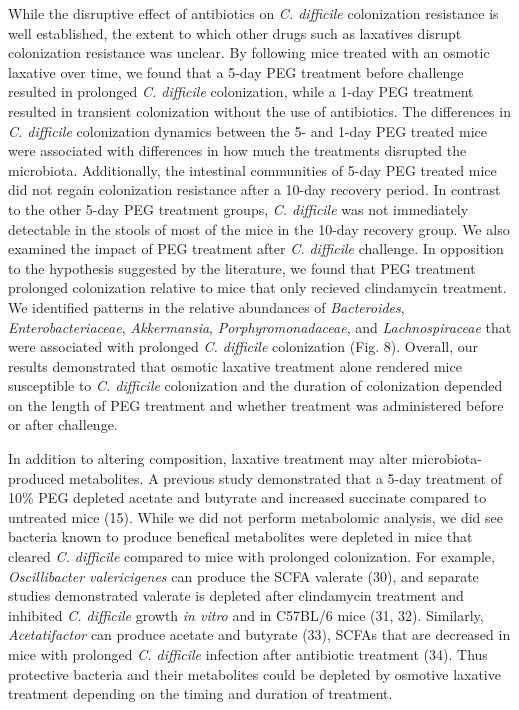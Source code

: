 \documentclass[
  11pt,
]{article}
\begin{document}
While the disruptive effect of antibiotics on \emph{C. difficile}
colonization resistance is well established, the extent to which other
drugs such as laxatives disrupt colonization resistance was unclear. By
following mice treated with an osmotic laxative over time, we found that
a 5-day PEG treatment before challenge resulted in prolonged \emph{C.
difficile} colonization, while a 1-day PEG treatment resulted in
transient colonization without the use of antibiotics. The differences
in \emph{C. difficile} colonization dynamics between the 5- and 1-day
PEG treated mice were associated with differences in how much the
treatments disrupted the microbiota. Additionally, the intestinal
communities of 5-day PEG treated mice did not regain colonization
resistance after a 10-day recovery period. In contrast to the other
5-day PEG treatment groups, \emph{C. difficile} was not immediately
detectable in the stools of most of the mice in the 10-day recovery
group. We also examined the impact of PEG treatment after \emph{C.
difficile} challenge. In opposition to the hypothesis suggested by the
literature, we found that PEG treatment prolonged colonization relative
to mice that only recieved clindamycin treatment. We identified patterns
in the relative abundances of \emph{Bacteroides},
\emph{Enterobacteriaceae}, \emph{Akkermansia},
\emph{Porphyromonadaceae}, and \emph{Lachnospiraceae} that were
associated with prolonged \emph{C. difficile} colonization (Fig. 8).
Overall, our results demonstrated that osmotic laxative treatment alone
rendered mice susceptible to \emph{C. difficile} colonization and the
duration of colonization depended on the length of PEG treatment and
whether treatment was administered before or after challenge.

In addition to altering composition, laxative treatment may alter
microbiota-produced metabolites. A previous study demonstrated that a
5-day treatment of 10\% PEG depleted acetate and butyrate and increased
succinate compared to untreated mice (15). While we did not perform
metabolomic analysis, we did see bacteria known to produce benefical
metabolites were depleted in mice that cleared \emph{C. difficile}
compared to mice with prolonged colonization. For example,
\emph{Oscillibacter valericigenes} can produce the SCFA valerate (30),
and separate studies demonstrated valerate is depleted after clindamycin
treatment and inhibited \emph{C. difficile} growth \emph{in vitro} and
in C57BL/6 mice (31, 32). Similarly, \emph{Acetatifactor} can produce
acetate and butyrate (33), SCFAs that are decreased in mice with
prolonged \emph{C. difficile} infection after antibiotic treatment (34).
Thus protective bacteria and their metabolites could be depleted by
osmotive laxative treatment depending on the timing and duration of
treatment.
\end{document}
